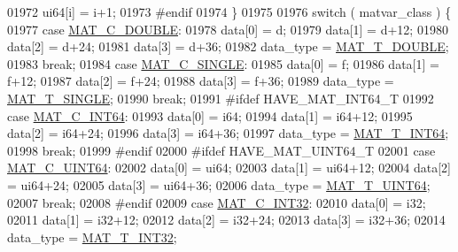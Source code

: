 \begin{DoxyCode}
{{{{{01972         ui64[i] = i+1;
01973 \textcolor{preprocessor}{#endif}
01974     \}
01975 
01976     \textcolor{keywordflow}{switch} ( matvar\_class ) \{
01977         \textcolor{keywordflow}{case} \hyperlink{group___m_a_t_ggad4d60ae7b709fc81bfd744fb4c857c40a5d70e0862e5bdb7bd86bf7ba5948f307}{MAT\_C\_DOUBLE}:
01978             data[0] = d;
01979             data[1] = d+12;
01980             data[2] = d+24;
01981             data[3] = d+36;
01982             data\_type = \hyperlink{group___m_a_t_ggacf7b3b879282b7ab3a51190e49bf3453a31e721ecf7e188196f83c32838288797}{MAT\_T\_DOUBLE};
01983             \textcolor{keywordflow}{break};
01984         \textcolor{keywordflow}{case} \hyperlink{group___m_a_t_ggad4d60ae7b709fc81bfd744fb4c857c40a2825631e26a961cbe0f79db50a39cea2}{MAT\_C\_SINGLE}:
01985             data[0] = f;
01986             data[1] = f+12;
01987             data[2] = f+24;
01988             data[3] = f+36;
01989             data\_type = \hyperlink{group___m_a_t_ggacf7b3b879282b7ab3a51190e49bf3453a3a3657d40e9212c923d9b9d03531b64c}{MAT\_T\_SINGLE};
01990             \textcolor{keywordflow}{break};
01991 \textcolor{preprocessor}{#ifdef HAVE\_MAT\_INT64\_T}
01992         \textcolor{keywordflow}{case} \hyperlink{group___m_a_t_ggad4d60ae7b709fc81bfd744fb4c857c40a1ea83bcde49b35477494412973f82409}{MAT\_C\_INT64}:
01993             data[0] = i64;
01994             data[1] = i64+12;
01995             data[2] = i64+24;
01996             data[3] = i64+36;
01997             data\_type = \hyperlink{group___m_a_t_ggacf7b3b879282b7ab3a51190e49bf3453a9e825b5d18b8f946eaf2b4b57e51c145}{MAT\_T\_INT64};
01998             \textcolor{keywordflow}{break};
01999 \textcolor{preprocessor}{#endif}
02000 \textcolor{preprocessor}{#ifdef HAVE\_MAT\_UINT64\_T}
02001         \textcolor{keywordflow}{case} \hyperlink{group___m_a_t_ggad4d60ae7b709fc81bfd744fb4c857c40a86470e25c3763d9a24623f04326195dd}{MAT\_C\_UINT64}:
02002             data[0] = ui64;
02003             data[1] = ui64+12;
02004             data[2] = ui64+24;
02005             data[3] = ui64+36;
02006             data\_type = \hyperlink{group___m_a_t_ggacf7b3b879282b7ab3a51190e49bf3453a45547932c46be27118abe08302d7e29f}{MAT\_T\_UINT64};
02007             \textcolor{keywordflow}{break};
02008 \textcolor{preprocessor}{#endif}
02009         \textcolor{keywordflow}{case} \hyperlink{group___m_a_t_ggad4d60ae7b709fc81bfd744fb4c857c40adb44fc39694e3152ae5e69470a2fefe8}{MAT\_C\_INT32}:
02010             data[0] = i32;
02011             data[1] = i32+12;
02012             data[2] = i32+24;
02013             data[3] = i32+36;
02014             data\_type = \hyperlink{group___m_a_t_ggacf7b3b879282b7ab3a51190e49bf3453a83e06a68320726c6572bfbb9f3addb1d}{MAT\_T\_INT32};
}}}}}
\end{DoxyCode}
